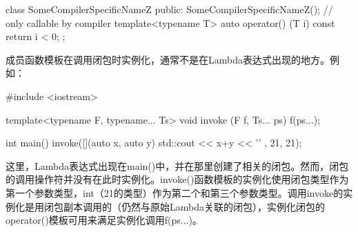 \begin{cpp}
class SomeCompilerSpecificNameZ {
	public:
	SomeCompilerSpecificNameZ(); // only callable by compiler
	template<typename T>
	auto operator() (T i) const
	{
		return i < 0;
	}
};
\end{cpp}

成员函数模板在调用闭包时实例化，通常不是在Lambda表达式出现的地方。例如：

\begin{cpp}
#include <iostream>

template<typename F, typename... Ts> void invoke (F f, Ts... ps) {
	f(ps...);
}

int main() {
	invoke([](auto x, auto y) {
		std::cout << x+y << '\n'
	},
	21, 21);
}
\end{cpp}

这里，Lambda表达式出现在main()中，并在那里创建了相关的闭包。然而，闭包的调用操作符并没有在此时实例化。invoke()函数模板的实例化使用闭包类型作为第一个参数类型，int（21的类型）作为第二个和第三个参数类型。调用invoke的实例化是用闭包副本调用的（仍然与原始Lambda关联的闭包），实例化闭包的operator()模板可用来满足实例化调用f(ps...)。













